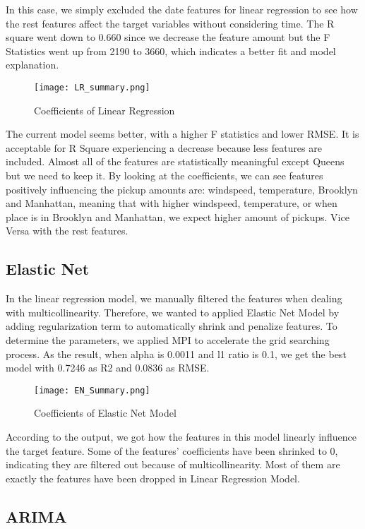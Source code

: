 \documentclass[article, 10 pt, conference]{ieeeconf}
\begin{document}
In this case, we simply excluded the date features for linear regression to see how the rest features affect the target variables without considering time. The R square went down to 0.660 since we decrease the feature amount but the F Statistics went up from 2190 to 3660, which indicates a better fit and model explanation. 

\begin{figure}[!htb]
     \texttt{[image: LR\_summary.png]}
    \caption{Coefficients of Linear Regression }
\end{figure}

The current model seems better, with a higher F statistics and lower RMSE. It is acceptable for R Square experiencing a decrease because less features are included. Almost all of the features are statistically meaningful except Queens but we need to keep it. By looking at the coefficients, we can see features positively influencing the pickup amounts are: windspeed, temperature, Brooklyn and Manhattan, meaning that with higher windspeed, temperature, or when place is in Brooklyn and Manhattan, we expect higher amount of pickups. Vice Versa with the rest features.


\subsection{Elastic Net}

In the linear regression model, we manually filtered the features when dealing with multicollinearity. Therefore, we wanted to applied Elastic Net Model by adding regularization term to automatically shrink and penalize features. To determine the parameters, we applied MPI to accelerate the grid searching process. As the result, when alpha is 0.0011 and l1 ratio is 0.1, we get the best model with 0.7246 as R2 and 0.0836 as RMSE.

\begin{figure}[!htb]
    \texttt{[image: EN\_Summary.png]}
    \caption{Coefficients of Elastic Net Model }
\end{figure}

According to the output, we got how the features in this model linearly influence the target feature. Some of the features' coefficients have been shrinked to 0, indicating they are filtered out because of multicollinearity. Most of them are exactly the features have been dropped in Linear Regression Model.


\subsection{ARIMA}
\end{document}
